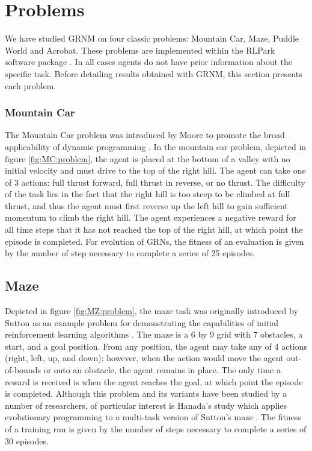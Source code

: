 

\section{Problems}

We have studied GRNM on four classic problems: Mountain Car, Maze, Puddle World and Acrobat. These problems are implemented within the RLPark software package \cite{Degris2014}. In all cases agents do not have prior information about the specific task. Before detailing results obtained with GRNM, this section presents each problem.
\subsubsection{Mountain Car}
The Mountain Car problem was introduced by Moore to promote the broad applicability of dynamic programming \cite{Moore1991}. In the mountain car problem, depicted in figure \ref{fig:MC:problem}, the agent is placed at the bottom of a valley with no initial velocity and must drive to the top of the right hill. The agent can take one of 3 actions: full thrust forward, full thrust in reverse, or no thrust. The difficulty of the task lies in the fact that the right hill is too steep to be climbed at full thrust, and thus the agent must first reverse up the left hill to gain sufficient momentum to climb the right hill. The agent experiences a negative reward for all time steps that it has not reached the top of the right hill, at which point the episode is completed. For evolution of GRNs, the fitness of an evaluation is given by the number of step necessary to complete a series of 25 episodes.

\subsection{Maze}

Depicted in figure \ref{fig:MZ:problem}, the maze task was originally introduced by Sutton as an example problem for demonstrating the capabilities of initial reinforcement learning algorithms \cite{Sutton1990}. The maze is a 6 by 9 grid with 7 obstacles, a start, and a goal position. From any position, the agent may take any of 4 actions (right, left, up, and down); however, when the action would move the agent out-of-bounds or onto an obstacle, the agent remains in place. The only time a reward is received is when the agent reaches the goal, at which point the episode is completed. Although this problem and its variants have been studied by a number of researchers, of particular interest is Hanada's study which applies evolutionary programming to a multi-task version of Sutton's maze \cite{Handa2007}. The fitness of a training run is given by the number of steps necessary to complete a series of 30 episodes.

